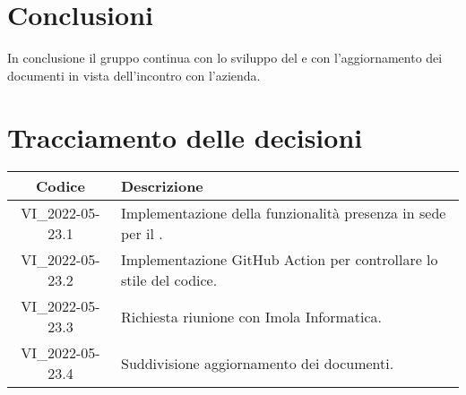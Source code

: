 \section{Conclusioni}
In conclusione il gruppo continua con lo sviluppo del  e con l'aggiornamento
dei documenti in vista dell'incontro con l'azienda.
\newpage

\section*{Tracciamento delle decisioni}
	\renewcommand{\arraystretch}{1.8} %
	\begin{tabular}{ |c|l| }
		\hline
		\textbf{Codice} & \textbf{Descrizione} \\
		\hline
		VI\_2022-05-23.1 & Implementazione della funzionalità presenza in sede per il \glossario{PoC}.\\
		\hline
		VI\_2022-05-23.2 & Implementazione GitHub Action per controllare lo stile del codice.\\
		\hline
		VI\_2022-05-23.3 & Richiesta riunione con Imola Informatica.\\
		\hline
		VI\_2022-05-23.4 & Suddivisione aggiornamento dei documenti.\\
		\hline
	\end{tabular}